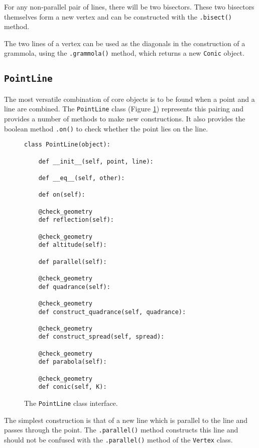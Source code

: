 For any non-parallel pair of lines, there will be two bisectors.
These two bisectors themselves form a new vertex and can be constructed with the \texttt{.bisect()} method.

The two lines of a vertex can be used as the diagonals in the construction of a grammola, using the \texttt{.grammola()} method, which returns a new \texttt{Conic} object.

\subsection{\texttt{PointLine}}

The most versatile combination of core objects is to be found when a point and a line are combined.
The \texttt{PointLine} class (Figure \ref{fig:pointline}) represents this pairing and provides a number of methods to make new constructions.
It also provides the boolean method \texttt{.on()} to check whether the point lies on the line.

\begin{figure}[!hbt]
\begin{verbatim}
class PointLine(object):

    def __init__(self, point, line):

    def __eq__(self, other):

    def on(self):

    @check_geometry
    def reflection(self):

    @check_geometry
    def altitude(self):

    def parallel(self):

    @check_geometry
    def quadrance(self):

    @check_geometry
    def construct_quadrance(self, quadrance):

    @check_geometry
    def construct_spread(self, spread):

    @check_geometry
    def parabola(self):

    @check_geometry
    def conic(self, K):
\end{verbatim}
\caption{The \texttt{PointLine} class interface.}\label{fig:pointline}
\end{figure}

The simplest construction is that of a new line which is parallel to the line and passes through the point.
The \texttt{.parallel()} method constructs this line and should not be confused with the \texttt{.parallel()} method of the \texttt{Vertex} class.

